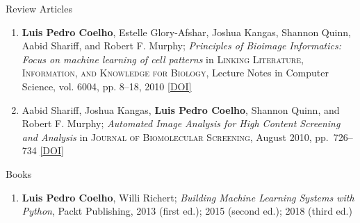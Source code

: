 \documentclass{article}
\renewcommand\subsection[1]{%
    \par\vspace{.1em}%
    {\hspace{1em}\subsubhead #1}%
    \par\vspace{.2em}%
}
\newcommand\showdoi[1]{%
    \href{http://dx.doi.org/#1}{[DOI]}%
}
\newcommand\pubname[1]{\textsc{#1}}
\begin{document}
\subsection{Review Articles}
\begin{enumerate}[resume]
\item \textbf{Luis Pedro Coelho}, Estelle Glory-Afshar, Joshua Kangas, Shannon
Quinn, Aabid Shariff, and Robert F. Murphy; \emph{Principles of Bioimage
Informatics: Focus on machine learning of cell patterns} in \pubname{Linking
Literature, Information, and Knowledge for Biology}, Lecture Notes in Computer
Science, vol.  6004, pp. 8--18, 2010 \showdoi{10.1007/978-3-642-13131-8_2}

\item Aabid Shariff, Joshua Kangas, \textbf{Luis Pedro Coelho}, Shannon Quinn,
and Robert F. Murphy; \emph{Automated Image Analysis for High Content Screening
and Analysis} in \pubname{Journal of Biomolecular Screening}, August 2010, pp.\
726--734 \showdoi{10.1177/1087057110370894}
\end{enumerate}
\subsection{Books}
\begin{enumerate}
\item \textbf{Luis Pedro Coelho}, Willi Richert; \emph{Building Machine
Learning Systems with Python}, Packt Publishing, 2013 (first ed.); 2015
(second ed.); 2018 (third ed.)
\end{enumerate}
\end{document}
